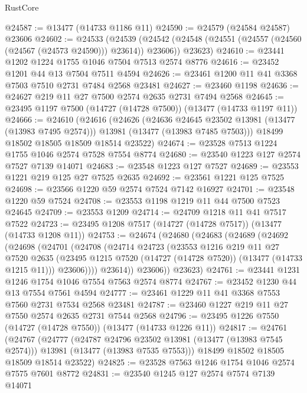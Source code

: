 \begin{lexlean}{RustCore}
\begin{coremodule}
@24587 := @13477 (@14733 @1186 @11)
@24590 := @24579 (@24584 @24587) @23606
@24602 := @24533
    (@24539
      (@24542 (@24548 (@24551 (@24557 (@24560 (@24567 (@24573 @24590))) @23614)) @23606))
      @23623)
@24610 := @23441 @1202 @1224 @1755 @1046 @7504 @7513 @2574 @8776
@24616 := @23452 @1201 @44 @13 @7504 @7511 @4594
@24626 := @23461 @1200 @11 @41 @3368 @7503 @7510 @2731 @7484 @2568 @23481
@24627 := @23460 @1198
@24636 := @24627 @219 @11 @27 @7500 @2574 @2635 @2731 @7494 @2568
@24645 := @23495 @1197 @7500 (@14727 (@14728 @7500)) (@13477 (@14733 @1197 @11))
@24666 := @24610
    (@24616
      (@24626
        (@24636 @24645 @23502 @13981 (@13477 (@13983 @7495 @2574)))
        @13981
        (@13477 (@13983 @7485 @7503)))
      @18499
      @18502
      @18505
      @18509
      @18514
      @23522)
@24674 := @23528 @7513 @1224 @1755 @1046 @2574 @7528 @7554 @8774
@24680 := @23540 @1223 @127 @2574 @7527 @7139 @14071
@24683 := @23548 @1223 @127 @7527
@24689 := @23553 @1221 @219 @125 @27 @7525 @2635
@24692 := @23561 @1221 @125 @7525
@24698 := @23566 @1220 @59 @2574 @7524 @7142 @16927
@24701 := @23548 @1220 @59 @7524
@24708 := @23553 @1198 @1219 @11 @44 @7500 @7523 @24645
@24709 := @23553 @1209
@24714 := @24709 @1218 @11 @41 @7517 @7522
@24723 := @23495 @1208 @7517 (@14727 (@14728 @7517)) (@13477 (@14733 @1208 @11))
@24753 := @24674
    (@24680
      (@24683
        (@24689
          (@24692
            (@24698
              (@24701
                (@24708
                  (@24714
                    @24723
                    (@23553
                      @1216
                      @219
                      @11
                      @27
                      @7520
                      @2635
                      (@23495 @1215 @7520 (@14727 (@14728 @7520)) (@13477 (@14733 @1215 @11)))
                      @23606))))
              @23614))
          @23606))
      @23623)
@24761 := @23441 @1231 @1246 @1754 @1046 @7554 @7563 @2574 @8774
@24767 := @23452 @1230 @44 @13 @7554 @7561 @4594
@24777 := @23461 @1229 @11 @41 @3368 @7553 @7560 @2731 @7534 @2568 @23481
@24787 := @23460 @1227 @219 @11 @27 @7550 @2574 @2635 @2731 @7544 @2568
@24796 := @23495 @1226 @7550 (@14727 (@14728 @7550)) (@13477 (@14733 @1226 @11))
@24817 := @24761
    (@24767
      (@24777
        (@24787 @24796 @23502 @13981 (@13477 (@13983 @7545 @2574)))
        @13981
        (@13477 (@13983 @7535 @7553)))
      @18499
      @18502
      @18505
      @18509
      @18514
      @23522)
@24825 := @23528 @7563 @1246 @1754 @1046 @2574 @7575 @7601 @8772
@24831 := @23540 @1245 @127 @2574 @7574 @7139 @14071

\end{coremodule}
\end{lexlean}
